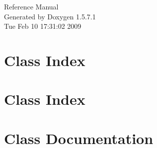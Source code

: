 \documentclass[a4paper]{book}
\begin{document}
\begin{titlepage}
\vspace*{7cm}
\begin{center}
{\Large Reference Manual}\\
\vspace*{1cm}
{\large Generated by Doxygen 1.5.7.1}\\
\vspace*{0.5cm}
{\small Tue Feb 10 17:31:02 2009}\\
\end{center}
\end{titlepage}
\clearemptydoublepage
{}
\tableofcontents
\clearemptydoublepage
{}
\chapter{Class Index}

\chapter{Class Index}

\chapter{Class Documentation}






























\printindex
\end{document}
